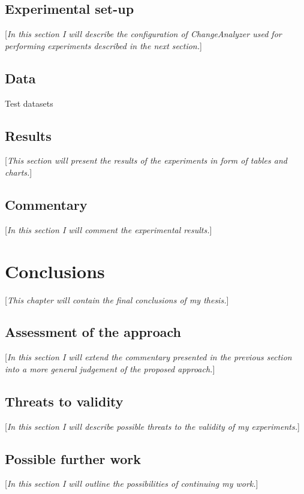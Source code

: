 \documentclass{pracamgr}
\begin{document}
\section{Experimental set-up}
\label{sec:set-up}
[\textit{In this section I will describe the configuration of ChangeAnalyzer used for performing experiments described in the next section.}]

\section{Data}
\label{sec:data}

\begin{table}[h!]
\centering
\caption{Test datasets}
\label{tab:test_datasets}

\end{table}

\section{Results}
\label{sec:results}
[\textit{This section will present the results of the experiments in form of tables and charts.}]

\section{Commentary}
\label{sec:commentary}
[\textit{In this section I will comment the experimental results.}]

\chapter{Conclusions}
\label{cha:conclusions}
[\textit{This chapter will contain the final conclusions of my thesis.}]

\section{Assessment of the approach}
\label{sec:assessment}
[\textit{In this section I will extend the commentary presented in the previous section into a more general judgement of the proposed approach.}]

\section{Threats to validity}
\label{sec:threats}
[\textit{In this section I will describe possible threats to the validity of my experiments.}]

\section{Possible further work}
\label{sec:further_work}
[\textit{In this section I will outline the possibilities of continuing my work.}]

\printbibliography[heading=bibintoc]
\end{document}
